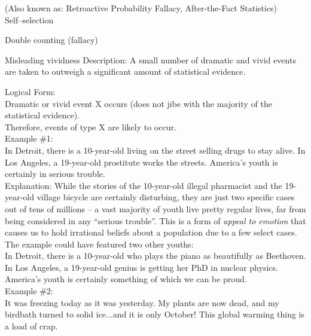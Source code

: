 \documentclass[a4paper,12pt,single,pdftex]{scrartcl}
\begin{document}
  
    
      (Also known as: Retroactive Probability Fallacy, After-the-Fact Statistics)
    \\

  

Self–selection

Double counting (fallacy)

Misleading vividness
    Description: A small number of dramatic and vivid events are taken to outweigh a significant amount of statistical evidence.

    
      Logical Form:
    \\

    
      Dramatic or vivid event X occurs (does not jibe with the majority of the statistical evidence).
    \\

    
      Therefore, events of type X are likely to occur.
    \\

    
      Example \#1:
    \\

    
      In Detroit, there is a 10-year-old living on the street selling drugs to stay alive.  In Los Angeles, a 19-year-old prostitute works the streets.  America’s youth is certainly in serious trouble.
    \\

    
      Explanation: While the stories of the 10-year-old illegal pharmacist and the 19-year-old village bicycle are certainly disturbing, they are just two specific cases out of tens of millions -- a vast majority of youth live pretty regular lives, far from being considered in any “serious trouble”.  This is a form of {\it appeal to emotion} that causes us to hold irrational beliefs about a population due to a few select cases.  The example could have featured two other youths:
    \\

    
      In Detroit, there is a 10-year-old who plays the piano as beautifully as Beethoven.  In Los Angeles, a 19-year-old genius is getting her PhD in nuclear physics.  America’s youth is certainly something of which we can be proud.
    \\

    
      Example \#2:
    \\

    
      It was freezing today as it was yesterday.  My plants are now dead, and my birdbath turned to solid ice...and it is only October!  This global warming thing is a load of crap.
    \\
\end{document}
